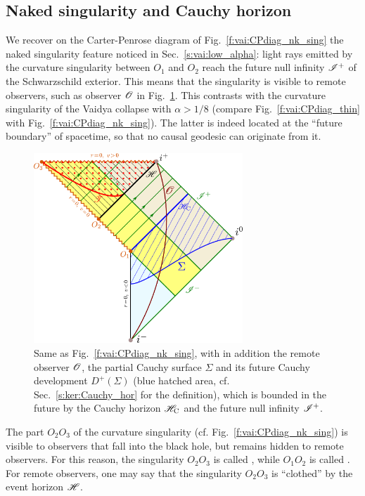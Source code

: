 \subsection{Naked singularity and Cauchy horizon} \label{s:vai:nak_Cauchy}

We recover on the Carter-Penrose diagram of Fig.~\ref{f:vai:CPdiag_nk_sing}
the naked singularity feature noticed in Sec.~\ref{s:vai:low_alpha}:
light rays emitted by the curvature singularity
between $O_1$ and $O_2$ reach the future null infinity $\mathscr{I}^+$ of the
Schwarzschild exterior. This means that the singularity is visible to
remote observers, such as observer $\mathscr{O}$ in Fig.~\ref{f:vai:CPdiag_Cauchy}.
This contrasts with the curvature singularity of the
Vaidya collapse with $\alpha > 1/8$ (compare Fig.~\ref{f:vai:CPdiag_thin}
with Fig.~\ref{f:vai:CPdiag_nk_sing}).
The latter is indeed located at the ``future boundary'' of spacetime, so that
no causal geodesic can originate from it.

\begin{figure}
\centerline{\includegraphics[width=0.7\textwidth]{vai_CPdiag_Cauchy.pdf}}
\caption[]{\label{f:vai:CPdiag_Cauchy} \footnotesize
Same as Fig.~\ref{f:vai:CPdiag_nk_sing}, with in addition the remote
observer $\mathscr{O}$, the partial Cauchy surface $\Sigma$ and its future Cauchy development $D^+(\Sigma)$ (blue hatched area, cf. Sec.~\ref{s:ker:Cauchy_hor} for the definition), which is bounded in the future by
the Cauchy horizon $\mathscr{H}_{\rm C}$ and the future null infinity $\mathscr{I}^+$.}
\end{figure}

\begin{remark}
The part $O_2 O_3$ of the curvature singularity (cf. Fig.~\ref{f:vai:CPdiag_nk_sing})
is visible to observers that fall into the black hole, but remains hidden
to remote observers. For this reason, the singularity $O_2 O_3$ is called
,
while $O_1 O_2$ is called
.
For remote observers, one may say that the
singularity $O_2 O_3$ is ``clothed'' by the event horizon $\mathscr{H}$.
\end{remark}

